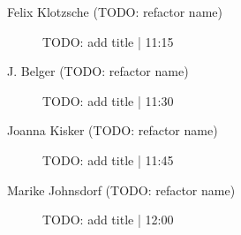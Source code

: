 \begin{symposium}
\begin{description}
                \item [Felix Klotzsche  (TODO: refactor name)] TODO: add title \textcolor{mygray}{ | 11:15}    
                
                \item [J. Belger (TODO: refactor name)] TODO: add title \textcolor{mygray}{ | 11:30}    
                
                \item [Joanna Kisker (TODO: refactor name)] TODO: add title \textcolor{mygray}{ | 11:45}    
                
                \item [Marike Johnsdorf (TODO: refactor name)] TODO: add title \textcolor{mygray}{ | 12:00}    
                
            \end{description} 
            \end{symposium}
            